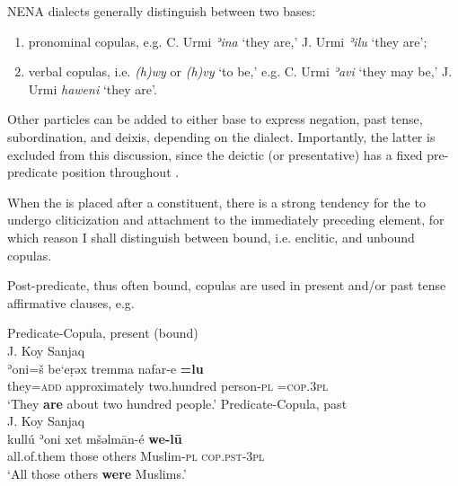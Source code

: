 \documentclass[output=paper,colorlinks,citecolor=brown,draftmode]{langscibook}
\begin{document}
NENA dialects generally distinguish between two  bases:

\begin{enumerate}[label=(\alph*)]
    \item pronominal copulas, e.g. C. Urmi \textit{ʾina} `they are,' J. Urmi \textit{ʾilu} `they are';
    \item verbal copulas, i.e. \textit{(h)wy} or \textit{(h)vy} `to be,' e.g. C. Urmi \textit{ʾavi} `they may be,' J. Urmi \textit{haweni} `they are'.
\end{enumerate}

Other particles can be added to either base  to express negation, past tense, subordination, and deixis, depending on the dialect. Importantly, the latter is excluded from this discussion, since the deictic (or presentative)  has a fixed pre-predicate position throughout \parencite[e.g.][227--247]{Molin2021Dohok}.  

When the  is placed after a constituent, there is a strong tendency for the  to undergo cliticization and attachment to the immediately preceding element, for which reason I shall distinguish between bound, i.e. enclitic, and unbound copulas.

Post-predicate, thus often bound, copulas are used in present and/or past tense affirmative clauses, e.g.

\ea
\ea\label{NAINEI:ex:26a}
Predicate-Copula, present (bound)\\
J. Koy Sanjaq \citep[1A:\S 1]{Mutzafi2004Koya} \\
\gll ʾoni=š be`eṛəx tremma nafar-e \textbf{=lu} \\
     they\textsc{=add} approximately two.hundred person\textsc{-pl} \textsc{=cop.3pl}  \\
\glt `They \textbf{are} about two hundred people.'
\ex\label{NAINEI:ex:26b}
Predicate-Copula, past\\
J. Koy Sanjaq \citep[1A:\S 1]{Mutzafi2004Koya} \\
\gll kullú ʾoni xet mšəlmān-é \textbf{we-lū} \\
     all.of.them those others Muslim\textsc{-pl} \textsc{cop.pst-3pl}  \\
\glt `All those others \textbf{were} Muslims.'
\z
\z
\end{document}
